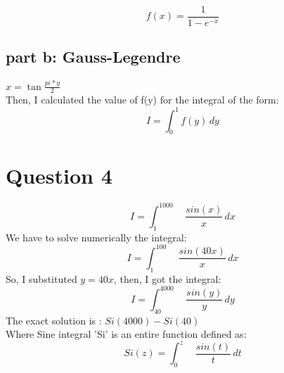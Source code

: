 \documentclass[11pt,a4paper,english]{article}
\begin{document}
\begin{displaymath}
f(x) = \frac{1}{1-e^{-x}} 
\end{displaymath}


\subsection{part b: Gauss-Legendre}

$x=\tan\frac{pi*y}{2}$ \\
Then, I calculated the value of f(y) for the integral of the form:\\
\begin{displaymath}
I = \int_0^1 \! \!f(y)\,dy 
\end{displaymath}


\section{Question 4}

\begin{displaymath}
I = \int_1^{1000} \quad \frac{sin(x)}{x}\,dx
\end{displaymath}
We have to solve numerically the integral:\\
\begin{displaymath}
I = \int_1^{100} \quad \frac{sin(40x)}{x}\,dx
\end{displaymath}
So, I substituted $y=40x$, then, I got the integral:\\
\begin{displaymath}
I = \int_{40}^{4000} \quad \frac{sin(y)}{y}\,dy
\end{displaymath}
The exact solution is : $Si(4000)-Si(40)$\\
Where Sine integral 'Si' is an entire function defined as:\\
\begin{displaymath}
Si(z) = \int_{0}^{z} \quad \frac{sin(t)}{t}\,dt
\end{displaymath}
\end{document}
